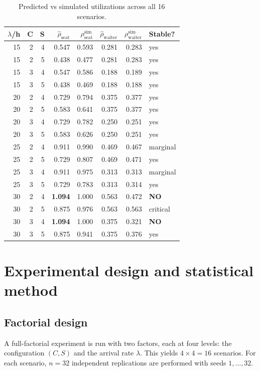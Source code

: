 \documentclass[11pt,a4paper]{article}
\begin{document}
\begin{table}[h]
\centering
\caption{Predicted vs simulated utilizations across all 16 scenarios.}
\label{tab:validation}
\small
\begin{tabular}{r r r r r r r l}
\toprule
$\lambda$/h & C & S & $\hat\rho_{\text{seat}}$ & $\rho_{\text{seat}}^{\text{sim}}$ &
$\hat\rho_{\text{waiter}}$ & $\rho_{\text{waiter}}^{\text{sim}}$ & Stable? \\
\midrule
15 & 2 & 4 & 0.547 & 0.593 & 0.281 & 0.283 & yes \\
15 & 2 & 5 & 0.438 & 0.477 & 0.281 & 0.283 & yes \\
15 & 3 & 4 & 0.547 & 0.586 & 0.188 & 0.189 & yes \\
15 & 3 & 5 & 0.438 & 0.469 & 0.188 & 0.188 & yes \\
20 & 2 & 4 & 0.729 & 0.794 & 0.375 & 0.377 & yes \\
20 & 2 & 5 & 0.583 & 0.641 & 0.375 & 0.377 & yes \\
20 & 3 & 4 & 0.729 & 0.782 & 0.250 & 0.251 & yes \\
20 & 3 & 5 & 0.583 & 0.626 & 0.250 & 0.251 & yes \\
25 & 2 & 4 & 0.911 & 0.990 & 0.469 & 0.467 & marginal \\
25 & 2 & 5 & 0.729 & 0.807 & 0.469 & 0.471 & yes \\
25 & 3 & 4 & 0.911 & 0.975 & 0.313 & 0.313 & marginal \\
25 & 3 & 5 & 0.729 & 0.783 & 0.313 & 0.314 & yes \\
30 & 2 & 4 & \textbf{1.094} & 1.000 & 0.563 & 0.472 & \textbf{NO} \\
30 & 2 & 5 & 0.875 & 0.976 & 0.563 & 0.563 & critical \\
30 & 3 & 4 & \textbf{1.094} & 1.000 & 0.375 & 0.321 & \textbf{NO} \\
30 & 3 & 5 & 0.875 & 0.941 & 0.375 & 0.376 & yes \\
\bottomrule
\end{tabular}
\end{table}

\section{Experimental design and statistical method}

\subsection{Factorial design}
A full-factorial experiment is run with two factors, each at four
levels: the configuration $(C,S)$ and the arrival rate $\lambda$. This
yields $4 \times 4 = 16$ scenarios. For each scenario, $n = 32$
independent replications are performed with seeds $1,\ldots,32$.
\end{document}

